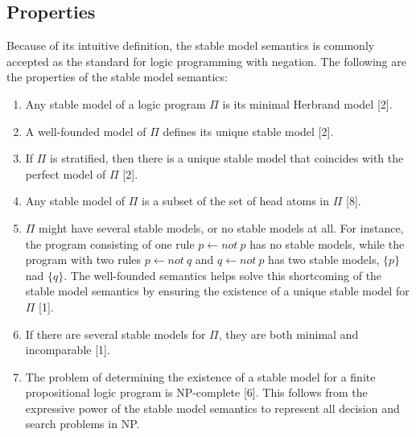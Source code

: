 \subsection{Properties}
Because of its intuitive definition, the stable model semantics is commonly 
accepted as the standard for logic programming with negation. The 
following are the properties of the stable model semantics:
\begin{enumerate}[label=(\roman*)]
    \item Any stable model of a logic program $\Pi$ is its minimal Herbrand model [2]. 
    \item A well-founded model of $\Pi$ defines its unique stable model [2]. 
    \item If $\Pi$ is stratified, then there is a unique stable model that coincides 
    with the perfect model of $\Pi$ [2].
    \item Any stable model of $\Pi$ is a subset of the set of head atoms in $\Pi$ [8].
    \item $\Pi$ might have several stable models, or no stable models at all. For 
    instance, the program consisting of one rule $p \leftarrow not \: p$ has no 
    stable models, while the program with two rules $p \leftarrow not \: q$ 
    and $q \leftarrow not \: p$ has two stable models, $\{p\}$ nad $\{q\}$. The 
    well-founded semantics helps solve this shortcoming of the stable model 
    semantics by ensuring the existence of a unique stable model for $\Pi$ [1].
    \item If there are several stable models for $\Pi$, they are both minimal 
    and incomparable [1]. 
    \item The problem of determining the existence of a stable model for a finite 
    propositional logic program is NP-complete [6]. This follows from the expressive 
    power of the stable model semantics to represent all decision and search 
    problems in NP. 
\end{enumerate}

